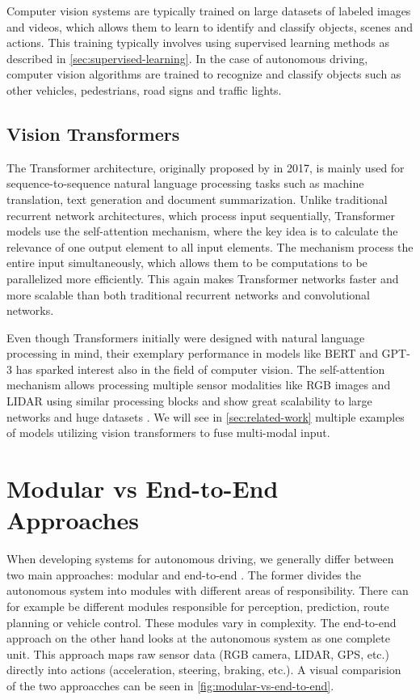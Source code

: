 Computer vision systems are typically trained on large datasets of labeled images and videos, which allows them to learn to identify and classify objects, scenes and actions. This training typically involves using supervised learning methods as described in \cref{sec:supervised-learning}. In the case of autonomous driving, computer vision algorithms are trained to recognize and classify objects such as other vehicles, pedestrians, road signs and traffic lights.

\subsection{Vision Transformers}
The Transformer architecture, originally proposed by \textcite{attention-is-all-you-need} in 2017, is mainly used for sequence-to-sequence natural language processing tasks such as machine translation, text generation and document summarization. Unlike traditional recurrent network architectures, which process input sequentially, Transformer models use the self-attention mechanism, where the key idea is to calculate the relevance of one output element to all input elements.  The mechanism process the entire input simultaneously, which allows them to be computations to be parallelized more efficiently. This again makes Transformer networks faster and more scalable than both traditional recurrent networks and convolutional networks. 

Even though Transformers initially were designed with natural language processing in mind, their exemplary performance in models like BERT \cite{bert} and GPT-3 \cite{gpt-3} has sparked interest also in the field of computer vision. The self-attention mechanism allows processing multiple sensor modalities like RGB images and LIDAR using similar processing blocks and show great scalability to large networks and huge datasets \cite{transformers-in-vision-survey}. We will see in \cref{sec:related-work} multiple examples of models utilizing vision transformers to fuse multi-modal input. %


\section{Modular vs End-to-End Approaches}
When developing systems for autonomous driving, we generally differ between two main approaches: modular and end-to-end \cite{multimodal-e2e-ad}. The former divides the autonomous system into modules with different areas of responsibility. There can for example be different modules responsible for perception, prediction, route planning or vehicle control. These modules vary in complexity. The end-to-end approach on the other hand looks at the autonomous system as one complete unit. This approach maps raw sensor data (RGB camera, LIDAR, GPS, etc.) directly into actions (acceleration, steering, braking, etc.). A visual comparision of the two approacches can be seen in \cref{fig:modular-vs-end-to-end}.

